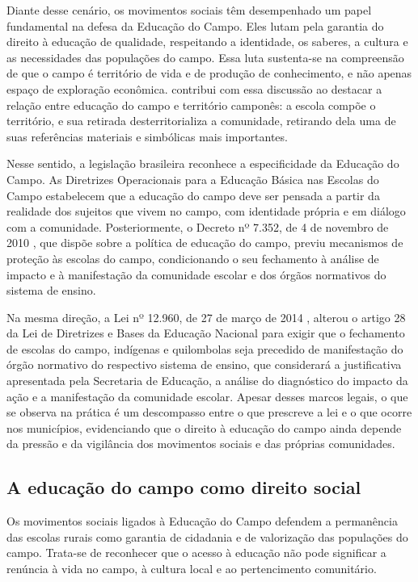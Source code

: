 \documentclass[
  12pt,
  openright,
  twoside,
  a4paper,
  english,
  brazilian,
  sumario=tradicional
]{abntex2}
\begin{document}
Diante desse cenário, os movimentos sociais têm desempenhado um papel fundamental na defesa da Educação do Campo. Eles lutam pela garantia do direito à educação de qualidade, respeitando a identidade, os saberes, a cultura e as necessidades das populações do campo. Essa luta sustenta-se na compreensão de que o campo é território de vida e de produção de conhecimento, e não apenas espaço de exploração econômica.  contribui com essa discussão ao destacar a relação entre educação do campo e território camponês: a escola compõe o território, e sua retirada desterritorializa a comunidade, retirando dela uma de suas referências materiais e simbólicas mais importantes.

Nesse sentido, a legislação brasileira reconhece a especificidade da Educação do Campo. As Diretrizes Operacionais para a Educação Básica nas Escolas do Campo \cite{brasil2002} estabelecem que a educação do campo deve ser pensada a partir da realidade dos sujeitos que vivem no campo, com identidade própria e em diálogo com a comunidade. Posteriormente, o Decreto nº 7.352, de 4 de novembro de 2010 \cite{brasil2010}, que dispõe sobre a política de educação do campo, previu mecanismos de proteção às escolas do campo, condicionando o seu fechamento à análise de impacto e à manifestação da comunidade escolar e dos órgãos normativos do sistema de ensino.

Na mesma direção, a Lei nº 12.960, de 27 de março de 2014 \cite{brasil2014}, alterou o artigo 28 da Lei de Diretrizes e Bases da Educação Nacional para exigir que o fechamento de escolas do campo, indígenas e quilombolas seja precedido de manifestação do órgão normativo do respectivo sistema de ensino, que considerará a justificativa apresentada pela Secretaria de Educação, a análise do diagnóstico do impacto da ação e a manifestação da comunidade escolar. Apesar desses marcos legais, o que se observa na prática é um descompasso entre o que prescreve a lei e o que ocorre nos municípios, evidenciando que o direito à educação do campo ainda depende da pressão e da vigilância dos movimentos sociais e das próprias comunidades.

\subsection{A educação do campo como direito social}
Os movimentos sociais ligados à Educação do Campo defendem a permanência das escolas rurais como garantia de cidadania e de valorização das populações do campo. Trata-se de reconhecer que o acesso à educação não pode significar a renúncia à vida no campo, à cultura local e ao pertencimento comunitário.
\end{document}

